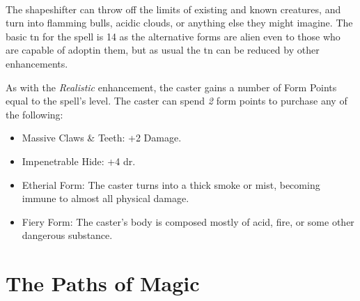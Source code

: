 \documentclass[titlepage,a4paper,openany]{book}
\begin{document}
\begin{multicols}{2}
\spelllevel

\\
The shapeshifter can throw off the limits of existing and known creatures, and turn into flamming bulls, acidic clouds, or anything else they might imagine.  The basic \gls{tn} for the spell is 14 as the alternative forms are alien even to those who are capable of adoptin them, but as usual the \gls{tn} can be reduced by other enhancements.

As with the \textit{Realistic} enhancement, the caster gains a number of Form Points equal to the spell's level.  The caster can spend \textit{2} form points to purchase any of the following:

\begin{itemize}

	\item{Massive Claws \& Teeth: +2 Damage.}
	\item{Impenetrable Hide: +4 \gls{dr}.}
	\item{Etherial Form: The caster turns into a thick smoke or mist, becoming immune to almost all physical damage.}
	\item{Fiery Form: The caster's body is composed mostly of acid, fire, or some other dangerous substance.  }

\end{itemize}

\end{multicols}

\chapter{The Paths of Magic}
\label{magic_paths}
\end{document}
